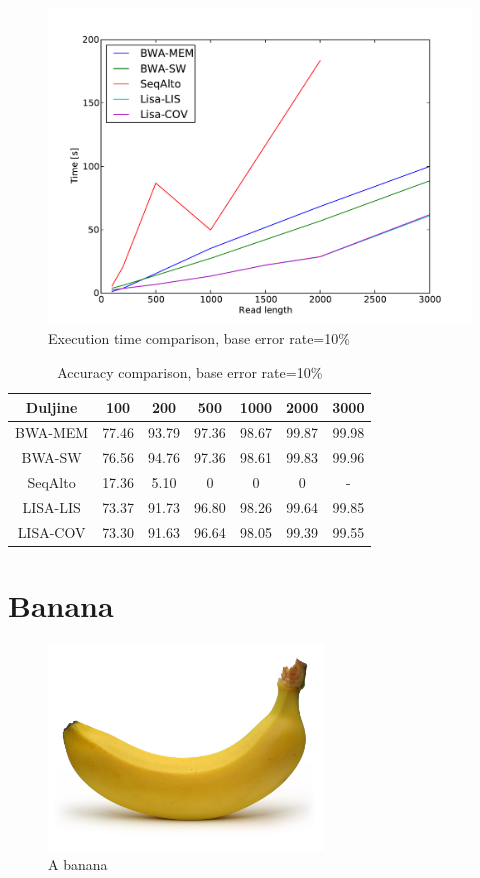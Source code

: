 \documentclass[times, utf8, diplomski]{fer}
\begin{document}
\begin{figure}[H]
\centering
\includegraphics[width=1.0\textwidth]{../img/yersinia-e10-time.pdf}
\caption{Execution time comparison, base error rate=10\%}\label{yersinia-e10-time}
\end{figure}

\begin{table}[H]
\centering
\begin{tabular}{|c||c|c|c|c|c|c|}
\hline
	Duljine & 100 & 200 & 500 & 1000 & 2000 & 3000\\
\hline
\hline
	BWA-MEM & 77.46 & 93.79 & 97.36 & 98.67 & 99.87 & 99.98\\
\hline
	BWA-SW  & 76.56 & 94.76 & 97.36 & 98.61 & 99.83 & 99.96\\
\hline
	SeqAlto & 17.36 & 5.10 & 0 & 0 & 0 & -\\
\hline
	LISA-LIS   & 73.37 & 91.73 & 96.80 & 98.26 & 99.64 & 99.85\\
\hline
	LISA-COV  & 73.30 & 91.63 & 96.64 & 98.05 & 99.39 & 99.55\\
\hline
\end{tabular}
\caption{Accuracy comparison, base error rate=10\%}\label{yersinia-e10-correct}
\end{table}


\section{Banana}

\begin{figure}[H]
\centering
\includegraphics[width=0.65\textwidth]{../img/banana.jpg}
\caption{A banana\cite{banana.img}}\label{banana}
\end{figure}
\end{document}
